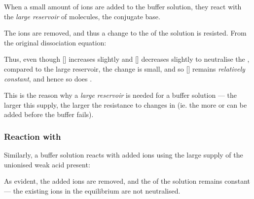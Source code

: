 				When a small amount of  ions are added to the buffer solution, they react with the \textit{large reservoir} of
				 molecules, the conjugate base.


				The  ions are removed, and thus a change to the \pH{} of the solution is resisted. From the original dissociation
				equation:


				Thus, even though [] increases slightly and [] decreases slightly to neutralise the , compared
				to the large reservoir, the change is small, and so [] remains \textit{relatively constant}, and hence so does \pH{}.

				This is the reason why a \textit{large reservoir} is needed for a buffer solution --- the larger this supply, the larger the
				resistance to changes in \pH{} (ie. the more  or  can be added before the buffer fails).




			\subsubsection{Reaction with }

				Similarly, a buffer solution reacts with added  ions using the large supply of the unionised weak acid present:


				As evident, the added  ions are removed, and the \pH{} of the solution remains constant --- the existing  ions
				in the equilibrium are not neutralised.

